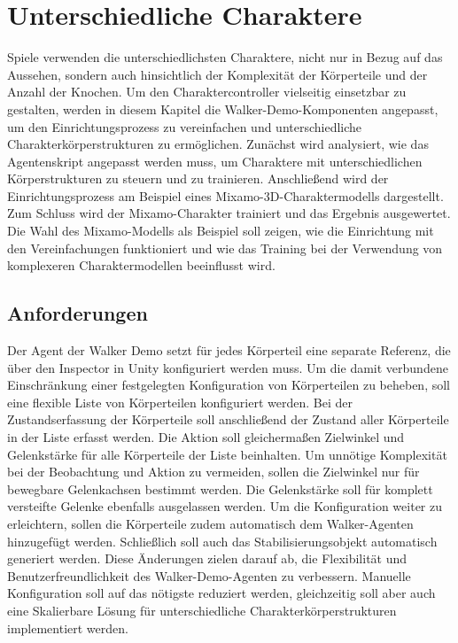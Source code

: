 \section{Unterschiedliche Charaktere}
Spiele verwenden die unterschiedlichsten Charaktere, nicht nur in Bezug auf das Aussehen, sondern auch hinsichtlich der Komplexität der Körperteile und der Anzahl der Knochen. Um den Charaktercontroller vielseitig einsetzbar zu gestalten, werden in diesem Kapitel die Walker-Demo-Komponenten angepasst, um den Einrichtungsprozess zu vereinfachen und unterschiedliche Charakterkörperstrukturen zu ermöglichen. Zunächst wird analysiert, wie das Agentenskript angepasst werden muss, um Charaktere mit unterschiedlichen Körperstrukturen zu steuern und zu trainieren. Anschließend wird der Einrichtungsprozess am Beispiel eines Mixamo-3D-Charaktermodells dargestellt. Zum Schluss wird der Mixamo-Charakter trainiert und das Ergebnis ausgewertet. Die Wahl des Mixamo-Modells als Beispiel soll zeigen, wie die Einrichtung mit den Vereinfachungen funktioniert und wie das Training bei der Verwendung von komplexeren Charaktermodellen beeinflusst wird.

\subsection{Anforderungen}	
Der Agent der Walker Demo setzt für jedes Körperteil eine separate Referenz, die über den Inspector in Unity konfiguriert werden muss. Um die damit verbundene Einschränkung einer festgelegten Konfiguration von Körperteilen zu beheben, soll eine flexible Liste von Körperteilen konfiguriert werden. Bei der Zustandserfassung der Körperteile soll anschließend der Zustand aller Körperteile in der Liste erfasst werden. Die Aktion soll gleichermaßen Zielwinkel und Gelenkstärke für alle Körperteile der Liste beinhalten. Um unnötige Komplexität bei der Beobachtung und Aktion zu vermeiden, sollen die Zielwinkel nur für bewegbare Gelenkachsen bestimmt werden. Die Gelenkstärke soll für komplett versteifte Gelenke ebenfalls ausgelassen werden. Um die Konfiguration weiter zu erleichtern, sollen die Körperteile zudem automatisch dem Walker-Agenten hinzugefügt werden. Schließlich soll auch das Stabilisierungsobjekt automatisch generiert werden. Diese Änderungen zielen darauf ab, die Flexibilität und Benutzerfreundlichkeit des Walker-Demo-Agenten zu verbessern. Manuelle Konfiguration soll auf das nötigste reduziert werden, gleichzeitig soll aber auch eine Skalierbare Lösung für unterschiedliche Charakterkörperstrukturen implementiert werden.

